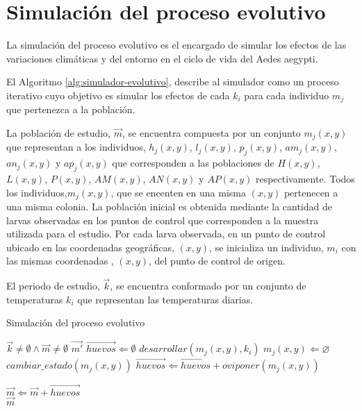 
\section{Simulación del proceso evolutivo}
La simulación del proceso evolutivo es el encargado de simular los efectos de las variaciones
climáticas y del entorno en el ciclo de vida del Aedes aegypti.

El Algoritmo \ref{alg:simulador-evolutivo}, describe al simulador como un proceso iterativo cuyo
objetivo es simular los efectos de cada $k_{i}$ para cada individuo $m_{j}$ que pertenezca a la
población.

La población de estudio, $\vec{m}$, se encuentra compuesta por un conjunto $m_{j}(x,y)$ que
representan a los individuos, $h_{j}(x,y)$, $l_{j}(x,y)$, $p_{j}(x,y)$, $am_{j}(x,y)$,
$an_{j}(x,y)$ y $ap_{j}(x,y)$ que corresponden a las poblaciones de $H(x,y)$, $L(x,y)$, $P(x,y)$,
$AM(x,y)$, $AN(x,y)$ y $AP(x,y)$ respectivamente. Todos los individuos,$m_{j}(x,y)$, que se
encenten en una misma $(x, y)$ pertenecen a una misma colonia. La población inicial es obtenida
mediante la cantidad de larvas observadas en los puntos de control que corresponden a la muestra
utilizada para el estudio. Por cada larva observada, en un punto de control ubicado en las
coordenadas geográficas, $(x, y)$, se inicializa un individuo, $m_{i}$ con las mismas coordenadas
, $(x, y)$, del punto de control de origen.

El periodo de estudio, $\vec{k}$, se encuentra conformado por un conjunto de temperaturas $k_{i}$
que representan las temperaturas diarias.

\begin{algorithm}
\caption{Simulación del proceso evolutivo \label{alg:simulador-evolutivo}}
\begin{algorithmic}[1]
    \Require $\vec{k}\neq \emptyset \land \vec{m} \neq \emptyset$
    \Ensure $\vec{m'}$
        \State $\vec{huevos} \Leftarrow \emptyset$
            \State $desarrollar(m_{j}(x, y), k_{i})$
                \State {}
                \State $m_{j}(x, y) \Leftarrow \varnothing $
                \State $ cambiar\_estado(m_{j}(x, y)) $
                \State $\vec{huevos} \Leftarrow \vec{huevos} + oviponer(m_{j}(x, y))$
            \EndIf
        \EndFor

            \State {}
            \State $\vec{m} \Leftarrow  \vec{m} + \vec{huevos}$
        \EndIf
    \EndFor \\
    \Return $\vec{m}$
\end{algorithmic}
\end{algorithm}


